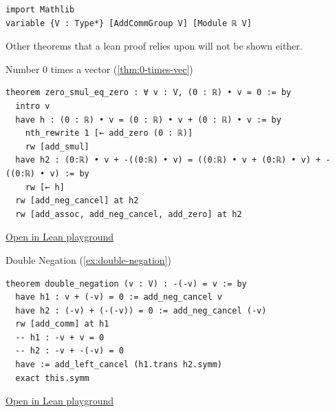 \documentclass[12pt]{book}
\begin{document}
\begin{verbatim}
import Mathlib
variable {V : Type*} [AddCommGroup V] [Module ℝ V]
\end{verbatim}

Other theorems that a lean proof relies upon will not be shown either.

\vspace{1cm}

\begin{leanbox}{Number 0 times a vector (\ref{thm:0-times-vec})} \label{lean:0-times-vec}
\begin{verbatim}
theorem zero_smul_eq_zero : ∀ v : V, (0 : ℝ) • v = 0 := by
  intro v
  have h : (0 : ℝ) • v = (0 : ℝ) • v + (0 : ℝ) • v := by
    nth_rewrite 1 [← add_zero (0 : ℝ)]
    rw [add_smul]
  have h2 : (0:ℝ) • v + -((0:ℝ) • v) = ((0:ℝ) • v + (0:ℝ) • v) + -((0:ℝ) • v) := by
    rw [← h]
  rw [add_neg_cancel] at h2
  rw [add_assoc, add_neg_cancel, add_zero] at h2
\end{verbatim}
\href{https://live.lean-lang.org/#codez=JYWwDg9gTgLgBAWQIYwBYBtgCMBQOBuSUwSW6ApnAN4BqcAXHACoCeY5AVAL5wDaAggBNBAYQggQAcSgQArmDg0AunwQRBsinEC4hIqV405aORBwAXuRkB9AM4hNV8gEcrFmQziAAIjj4PNADRwABQADB7aAJRwgEQEPnAAvHBh9IlYLDhwcMAAdjDu%2BBlwqEj4lKgeoeFRsb6JlYyRMXEA1MHJOtVxKXBphZm5qFZQ5ADuxDCUAIx8gAmEcEjCrpYQbVX6mZlQI3wLgrb26OtFJWUATBUh9I01cK0AtEGhV534UXVP1y1tz02vt3APD4vKLdXobOBbWZFI6Q3i7KzZcgAcysAGMkNlUeRDvN4KhToVYfCkDYbBBUYF4YiUejMdjKYs3BAVCgiqcgA}{Open in Lean playground}
\end{leanbox}

\begin{leanbox}{Double Negation (\ref{ex:double-negation})} \label{lean:double-negation}
\begin{verbatim}
theorem double_negation (v : V) : -(-v) = v := by
  have h1 : v + (-v) = 0 := add_neg_cancel v
  have h2 : (-v) + (-(-v)) = 0 := add_neg_cancel (-v)
  rw [add_comm] at h1
  -- h1 : -v + v = 0
  -- h2 : -v + -(-v) = 0
  have := add_left_cancel (h1.trans h2.symm)
  exact this.symm
\end{verbatim}
\href{https://live.lean-lang.org/#codez=JYWwDg9gTgLgBAWQIYwBYBtgCMBQOBuSUwSW6ApnAN4BqcAXHACoCeY5AVAL5wDaAggBNBAYQggQAcSgQArmDg0AunwQRBsinEC4hIqV405aORBxBcsuQD6AO3IBzFMAg24ACnwNFASi8BaNz98XwBeOE96MKwWHDg4VCR8SlQARi9PAGp3INC4AAYGMKRhWwcrAGMkG3LydHDY%2BMTkgCYvQOC4LMD271yCyLhiwVL7Cqqaup6GqAB3PiGK8RAVFHiUhr8%2FNf9M8LgwvI2t1FbGIM64AJz9%2FIaEpMLBkooAMxgx6tr3VIA6GCgqgBneLNH6AlgSbwNcgADyQ5XgaGAgLBEJAQA}{Open in Lean playground}
\end{leanbox}
\end{document}

